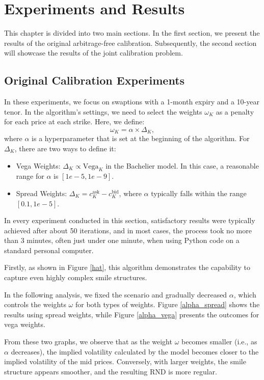 \chapter{Experiments and Results}

This chapter is divided into two main sections. In the first section, 
we present the results of the original arbitrage-free calibration. 
Subsequently, the second section will showcase the results of the joint calibration problem.

\section{Original Calibration Experiments}
In these experiments, we focus on swaptions with a 1-month expiry and a 10-year tenor.
In the algorithm's settings, we need to select the weights \(\omega_{K}\) as a penalty for each price at each strike. Here, we define:
\[
\omega_{K} = \alpha \times \Delta_{K},
\]
where \(\alpha\) is a hyperparameter that is set at the beginning of the algorithm. For \(\Delta_{K}\), there are two ways to define it:
\begin{itemize}
    \item Vega Weights: \(\Delta_{K} \propto \text{Vega}_{K}\) in the Bachelier model. In this case, a reasonable range for \(\alpha\) is \([1e-5, 1e-9]\).
    \item Spread Weights: \(\Delta_{K} = c^{\text{ask}}_{K} - c^{\text{bid}}_{K}\), where \(\alpha\) typically falls within the range \([0.1, 1e-5]\).
\end{itemize}
In every experiment conducted in this section, satisfactory results were typically achieved after about 50 iterations, 
and in most cases, the process took no more than 3 minutes, often just under one minute, 
when using Python code on a standard personal computer.

Firstly, as shown in Figure \ref{hat}, this algorithm demonstrates the capability to capture even highly complex smile structures.

In the following analysis, we fixed the scenario and gradually decreased \(\alpha\), which controls the weights \(\omega\) 
for both types of weights. Figure \ref{alpha_spread} shows the results using spread weights, while Figure \ref{alpha_vega} 
presents the outcomes for vega weights.

From these two graphs, we observe that as the weight \(\omega\) becomes smaller (i.e., as \(\alpha\) decreases), 
the implied volatility calculated by the model becomes closer to the implied volatility of the mid prices. 
Conversely, with larger weights, the smile structure appears smoother, and the resulting RND is more regular.

